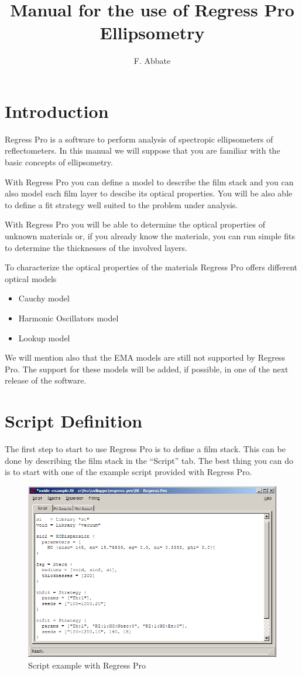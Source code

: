 \documentclass[a4paper]{report}
\begin{document}
\title{Manual for the use of Regress Pro Ellipsometry}
\author{F. Abbate}
\maketitle
\chapter{Introduction}
Regress Pro is a software to perform analysis of spectropic
ellipsometers of reflectometers. In this manual we will suppose that
you are familiar with the basic concepts of ellipsometry.

With Regress Pro you can define a model to describe the film stack and
you can also model each film layer to descibe its optical
properties. You will be also able to define a fit strategy well suited
to the problem under analysis.

With Regress Pro you will be able to determine the optical properties
of unknown materials or, if you already know the materials, you can
run simple fits to determine the thicknesses of the involved layers.

To characterize the optical properties of the materials Regress Pro
offers different optical models
\begin{itemize}
  \item Cauchy model
  \item Harmonic Oscillators model
  \item Lookup model
\end{itemize}
We will mention also that the EMA models are still not supported by
Regress Pro. The support for these models will be added, if possible,
in one of the next release of the software.

\chapter{Script Definition}
The first step to start to use Regress Pro is to define a film
stack. This can be done by describing the film stack in the ``Script''
tab. The best thing you can do is to start with one of the example
script provided with Regress Pro.
\begin{figure}[!thp]
  \includegraphics[width=\textwidth]{figure/screenshot-script-new.png}
  \caption{Script example with Regress Pro}
\end{figure}
\end{document}
